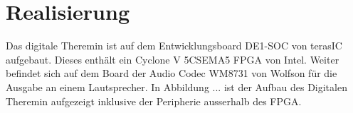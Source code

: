 \clearpage
\section{Realisierung}\label{sec:Realisierung}

Das digitale Theremin ist auf dem Entwicklungsboard DE1-SOC von terasIC aufgebaut. Dieses enthält ein Cyclone V 5CSEMA5 FPGA von Intel. Weiter befindet sich auf dem Board der Audio Codec WM8731 von Wolfson für die Ausgabe an einem Lautsprecher. In Abbildung ...  ist der Aufbau des Digitalen Theremin aufgezeigt inklusive der Peripherie ausserhalb des FPGA.


